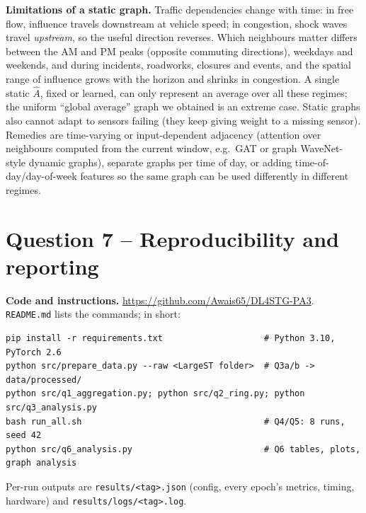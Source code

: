 \textbf{Limitations of a static graph.} Traffic dependencies change with time: in free flow, influence travels downstream at vehicle
speed; in congestion, shock waves travel \emph{upstream}, so the useful direction reverses. Which neighbours matter differs between the AM and
PM peaks (opposite commuting directions), weekdays and weekends, and during incidents, roadworks, closures and events, and the spatial
range of influence grows with the horizon and shrinks in congestion. A single static $\hat A$, fixed or learned, can only represent an
average over all these regimes; the uniform ``global average'' graph we obtained is an extreme case. Static graphs also cannot
adapt to sensors failing (they keep giving weight to a missing sensor). Remedies are time-varying or input-dependent adjacency
(attention over neighbours computed from the current window, e.g.\ GAT or graph WaveNet-style dynamic graphs), separate graphs per time
of day, or adding time-of-day/day-of-week features so the same graph can be used differently in different regimes.

\section*{Question 7 -- Reproducibility and reporting}

\textbf{Code and instructions.} \url{https://github.com/Awais65/DL4STG-PA3}. \texttt{README.md} lists the commands; in short:
\begin{lstlisting}
pip install -r requirements.txt                    # Python 3.10, PyTorch 2.6
python src/prepare_data.py --raw <LargeST folder>  # Q3a/b -> data/processed/
python src/q1_aggregation.py; python src/q2_ring.py; python src/q3_analysis.py
bash run_all.sh                                    # Q4/Q5: 8 runs, seed 42
python src/q6_analysis.py                          # Q6 tables, plots, graph analysis
\end{lstlisting}
Per-run outputs are \texttt{results/<tag>.json} (config, every epoch's metrics, timing, hardware) and \texttt{results/logs/<tag>.log}.

